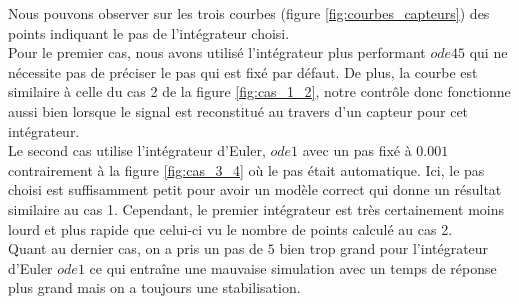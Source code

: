 \documentclass[11pt,french]{article} %
\begin{document}
Nous pouvons observer sur les trois courbes (figure \ref{fig:courbes_capteurs}) des points indiquant le pas de l'intégrateur choisi. \\

Pour le premier cas, nous avons utilisé l'intégrateur plus performant $ode45$ qui ne nécessite pas de préciser le pas qui est fixé par défaut. De plus, la courbe est similaire à celle du cas 2 de la figure \ref{fig:cas_1_2}, notre contrôle donc fonctionne aussi bien lorsque le signal est reconstitué au travers d'un capteur pour cet intégrateur. \\

Le second cas utilise l'intégrateur d'Euler, $ode1$ avec un pas fixé à $0.001$ contrairement à la figure \ref{fig:cas_3_4} où le pas était automatique. Ici, le pas choisi est suffisamment petit pour avoir un modèle correct qui donne un résultat similaire au cas 1. Cependant, le premier intégrateur est très certainement moins lourd et plus rapide que celui-ci vu le nombre de points calculé au cas 2. \\

Quant au dernier cas, on a pris un pas de $5$ bien trop grand pour l'intégrateur d'Euler $ode1$ ce qui entraîne une mauvaise simulation avec un temps de réponse plus grand mais on a toujours une stabilisation.
\end{document}

